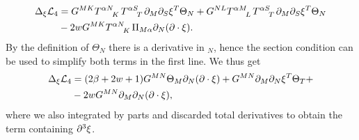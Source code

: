 \begin{equation}
    \begin{aligned}
    \Delta_\xi \mathcal{L}_4 &= G^{MK}\tensor{T}{^{\alpha N}_K}\tensor{T}{^{\alpha S}_T}\pd_M\pd_S\xi^T\Theta_N+G^{NL}\tensor{T}{^{\alpha M}_L}\tensor{T}{^{\alpha S}_T}\pd_M\pd_S\xi^T\Theta_N\\
    &-2wG^{MK}\tensor{T}{^{\alpha N}_K}\Pi_{M\alpha}\pd_N(\pd\cdot\xi).
    \end{aligned}
\end{equation}
By the definition of $\Theta_{N}$ there is a derivative in $_N$, hence the section condition can be used to simplify both terms in the first line. We thus get
\begin{equation}
    \begin{aligned}
    \Delta_\xi \mathcal{L}_4 &= (2\beta+2w+1)G^{MN}\Theta_M\partial_N(\partial\cdot\xi)+G^{MN}\partial_M\partial_N\xi^T\Theta_T+\\
    &-2wG^{MN}\partial_M\partial_N(\partial\cdot\xi),
    \end{aligned}
\end{equation}
where we also integrated by parts and discarded total derivatives to obtain the term containing $\partial^3\xi$. 

